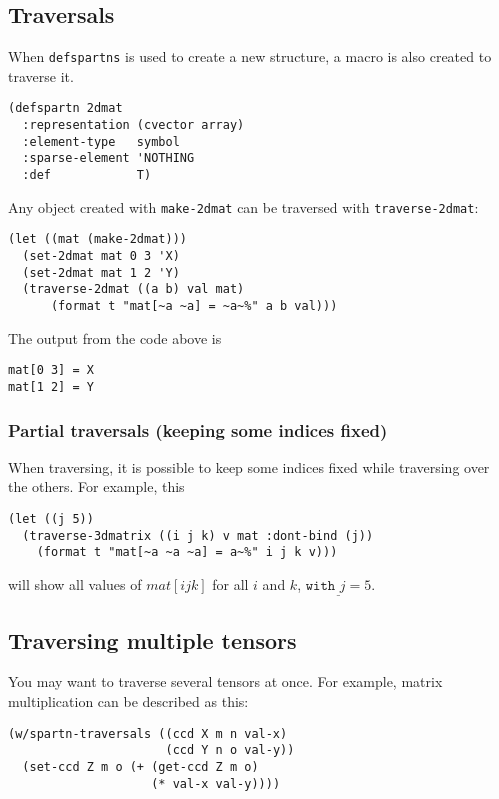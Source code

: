 \documentclass{article}
\begin{document}
\subsection{Traversals}

When \verb+defspartns+ is used to create a new structure, a macro is also created to traverse it.

\begin{lstlisting}
(defspartn 2dmat
  :representation (cvector array)
  :element-type   symbol
  :sparse-element 'NOTHING
  :def            T)
\end{lstlisting}

Any object created with \verb+make-2dmat+ can be traversed with \verb+traverse-2dmat+:

\begin{lstlisting}
(let ((mat (make-2dmat)))
  (set-2dmat mat 0 3 'X)
  (set-2dmat mat 1 2 'Y)
  (traverse-2dmat ((a b) val mat)
      (format t "mat[~a ~a] = ~a~%" a b val)))
\end{lstlisting}

The output from the code above is

\begin{lstlisting}
mat[0 3] = X
mat[1 2] = Y
\end{lstlisting}

\subsubsection{Partial traversals (keeping some indices fixed)}

When traversing, it is possible to keep some indices fixed while
traversing over the others. For example, this

\begin{lstlisting}
(let ((j 5))
  (traverse-3dmatrix ((i j k) v mat :dont-bind (j))
    (format t "mat[~a ~a ~a] = a~%" i j k v)))
\end{lstlisting}

will show all values of $mat[i j k]$ for all $i$ and $k$, $\underline{ \texttt{with } j=5}$.

\subsection{Traversing multiple tensors}

You may want to traverse several tensors at once. For example, matrix multiplication
can be described as this:

\begin{lstlisting}
(w/spartn-traversals ((ccd X m n val-x)
                      (ccd Y n o val-y))
  (set-ccd Z m o (+ (get-ccd Z m o)
                    (* val-x val-y))))
\end{lstlisting}
\end{document}
